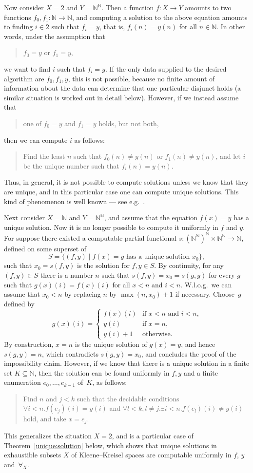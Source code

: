 \documentclass[10pt]{article}
\newcommand{\N}{\mathbb{N}}
\begin{document}
Now consider $X=2$ and $Y=\N^\N$. Then a function $f \colon X \to Y$
amounts to two functions $f_0,f_1 \colon \N \to \N$, and computing a
solution to the above equation amounts to finding $i \in 2$ such that
$f_i = y$, that is, $f_i(n)=y(n)$ for all $n \in \N$. In other words,
under the assumption that
\begin{quote}
  $f_0 = y$ or $f_1 = y$,
\end{quote}
we want to find $i$ such that $f_i = y$. If the only data supplied to
the desired algorithm are $f_0,f_1,y$, this is not possible, because
no finite amount of information about the data can determine that one
particular disjunct holds (a similar situation is worked out in detail
below). However, if we instead assume that
\begin{quote}
  one of $f_0 = y$ and $f_1 = y$ holds, but not both,
\end{quote}
then we can compute $i$ as follows:
\begin{quote}
  Find the least $n$ such that $f_0(n)\ne y(n)$ or $f_1(n) \ne y(n)$,
  and let $i$ be the unique number such that $f_i(n)=y(n)$.
\end{quote}
Thus, in general, it is not possible to compute solutions unless we
know that they are unique, and in this particular case one can compute
unique solutions. This kind of phenomenon is well known --- see
e.g.~\cite{beeson}.

Next consider $X=\N$ and $Y=\N^\N$, and assume that the equation
$f(x)=y$ has a unique solution. Now it is no longer possible to
compute it uniformly in $f$ and $y$. For suppose there existed a
computable partial functional $s \colon (\N^\N)^\N \times \N^\N \to
\N$, defined on some superset of 
\[
S=\{ (f,y) \mid \text{$f(x)=y$ has a unique solution $x_0$}\}, 
\]
such that $x_0=s(f,y)$ is the solution
for $f,y \in S$.  By continuity, for any $(f,y) \in S$
there is a number $n$ such that $s(f,y)=x_0=s(g,y)$ for every $g$ such
that $g(x)(i)=f(x)(i)$ for all $x < n$ and $i<n$.  W.l.o.g.\ we can
assume that $x_0 < n$ by replacing $n$ by $\max(n,x_0)+1$ if
necessary.  Choose~$g$ defined by
\[
g(x)(i) = 
\begin{cases}
f(x)(i) & \text{if $x<n$ and $i<n$,} \\
y(i) & \text{if $x=n$}, \\
y(i)+1 & \text{otherwise.}
\end{cases}
\]
By construction, $x=n$ is the unique solution of $g(x)=y$, and hence
$s(g,y)= n$, which contradicts $s(g,y)=x_0$, and concludes the proof
of the impossibility claim. However, if we know that there is a unique
solution in a finite set $K \subseteq \N$, then the solution can be
found uniformly in $f,y$ and a finite enumeration $e_0,\dots, e_{k-1}$
of~$K$, as follows:
\begin{quote}
  Find $n$ and $j<k$ such that the decidable conditions $\forall
  i<n.f(e_j)(i)=y(i)$ and $\forall l<k, l \ne j. \exists i<n.
  f(e_l)(i) \ne y(i)$ hold, and take $x=e_j$.
\end{quote}
This generalizes the situation $X=2$, and is a particular case of
Theorem~\ref{unique:solution} below, which shows that unique solutions
in exhaustible subsets $X$ of Kleene--Kreisel spaces are computable
uniformly in $f$, $y$ and~$\forall_X$.
\end{document}

